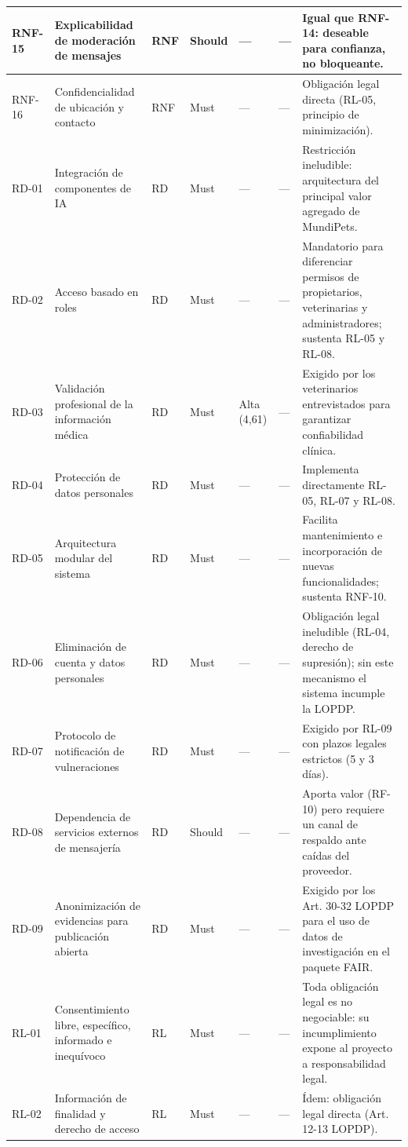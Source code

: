 \documentclass[journal,onecolumn]{IEEEtran}
\begin{document}
\begin{landscape}
\begin{longtable}{@{}p{1.2cm} p{5.2cm} p{1.0cm} p{1.3cm} p{1.3cm} p{1.1cm} p{6.5cm}@{}}
			RNF-15 & Explicabilidad de moderación de mensajes & RNF & Should & --- & --- & Igual que RNF-14: deseable para confianza, no bloqueante. \\ \midrule
			RNF-16 & Confidencialidad de ubicación y contacto & RNF & Must & --- & --- & Obligación legal directa (RL-05, principio de minimización). \\ \midrule
			RD-01 & Integración de componentes de IA & RD & Must & --- & --- & Restricción ineludible: arquitectura del principal valor agregado de MundiPets. \\ \midrule
			RD-02 & Acceso basado en roles & RD & Must & --- & --- & Mandatorio para diferenciar permisos de propietarios, veterinarias y administradores; sustenta RL-05 y RL-08. \\ \midrule
			RD-03 & Validación profesional de la información médica & RD & Must & Alta (4,61) & --- & Exigido por los veterinarios entrevistados para garantizar confiabilidad clínica. \\ \midrule
			RD-04 & Protección de datos personales & RD & Must & --- & --- & Implementa directamente RL-05, RL-07 y RL-08. \\ \midrule
			RD-05 & Arquitectura modular del sistema & RD & Must & --- & --- & Facilita mantenimiento e incorporación de nuevas funcionalidades; sustenta RNF-10. \\ \midrule
			RD-06 & Eliminación de cuenta y datos personales & RD & Must & --- & --- & Obligación legal ineludible (RL-04, derecho de supresión); sin este mecanismo el sistema incumple la LOPDP. \\ \midrule
			RD-07 & Protocolo de notificación de vulneraciones & RD & Must & --- & --- & Exigido por RL-09 con plazos legales estrictos (5 y 3 días). \\ \midrule
			RD-08 & Dependencia de servicios externos de mensajería & RD & Should & --- & --- & Aporta valor (RF-10) pero requiere un canal de respaldo ante caídas del proveedor. \\ \midrule
			RD-09 & Anonimización de evidencias para publicación abierta & RD & Must & --- & --- & Exigido por los Art. 30-32 LOPDP para el uso de datos de investigación en el paquete FAIR. \\ \midrule
			RL-01 & Consentimiento libre, específico, informado e inequívoco & RL & Must & --- & --- & Toda obligación legal es no negociable: su incumplimiento expone al proyecto a responsabilidad legal. \\ \midrule
			RL-02 & Información de finalidad y derecho de acceso & RL & Must & --- & --- & Ídem: obligación legal directa (Art. 12-13 LOPDP). \\ \midrule

\end{longtable}
\end{landscape}
\end{document}
